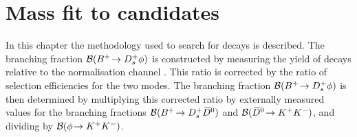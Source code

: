 \chapter{Mass fit to \decay{\Bp}{\Dsp\phiz} candidates} 
\label{ch:B2DsPhi}

\minitoc

In this chapter the methodology used to search for \decay{\Bp}{\Dsp\phiz} decays is described.
The branching fraction ${\mathcal{B}}({{{B}^+}}\!\rightarrow {\ensuremath{{D}^+_{s}}}\phi)$ is constructed by measuring the yield of \decay{\Bp}{\Dsp\phiz} decays relative to the normalisation channel \decay{\Bp}{\Dsp\Dzb}. This ratio is corrected by the ratio of selection efficiencies for the two modes. 
The branching fraction ${\mathcal{B}}({{{B}^+}}\!\rightarrow {\ensuremath{{D}^+_{s}}}\phi)$ is then determined by multiplying this corrected ratio by externally measured values for the branching fractions ${\mathcal{B}}({{{B}^+}}\!\rightarrow {\ensuremath{{D}^+_{s}}}{\ensuremath{{\kern 0.2em\overline{\kern -0.2em D}{}}{}^0}})$ and ${\mathcal{B}}({{\kern 0.2em\overline{\kern -0.2em D}{}}{}^0}\!\rightarrow {\ensuremath{{K}^+}}{\ensuremath{{K}^-}})$, and dividing by ${\mathcal{B}}(\phi\!\rightarrow {\ensuremath{{K}^+}}{\ensuremath{{K}^-}})$. 


